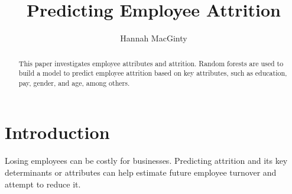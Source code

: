 \documentclass[11pt,preprint, authoryear]{elsarticle}
\numberwithin{equation}{section}
\numberwithin{figure}{section}
\numberwithin{table}{section}
\begin{document}
\begin{frontmatter}  %

\title{Predicting Employee Attrition}





\author[Add1]{Hannah MacGinty}





\address[Add1]{Stellenbosch University, Cape Town, South Africa}


\begin{abstract}
\small{
This paper investigates employee attributes and attrition. Random
forests are used to build a model to predict employee attrition based on
key attributes, such as education, pay, gender, and age, among others.
}
\end{abstract}

\vspace{1cm}





\vspace{0.5cm}

\end{frontmatter}

\setcounter{footnote}{0}



\pagestyle{fancy}
\chead{}
\rhead{}
\lfoot{}
\lhead{}
\cfoot{}


\headsep 35pt %




\hypertarget{introduction}{%
\section{\texorpdfstring{Introduction
\label{Introduction}}{Introduction }}\label{introduction}}

Losing employees can be costly for businesses. Predicting attrition and
its key determinants or attributes can help estimate future employee
turnover and attempt to reduce it.
\end{document}
